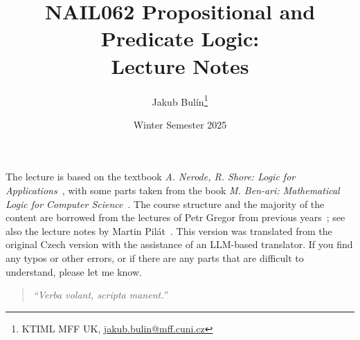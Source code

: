 \title{NAIL062 Propositional and Predicate Logic: \\ Lecture Notes}
\author{Jakub Bulín\footnote{KTIML MFF UK, \href{mailto://jakub.bulin@mff.cuni.cz}{jakub.bulin@mff.cuni.cz}}}
\date{Winter Semester 2025}
\maketitle

The lecture is based on the textbook \emph{A. Nerode, R. Shore: Logic for Applications}~\cite{nerode_logic_2012}, with some parts taken from the book \emph{M. Ben-ari: Mathematical Logic for Computer Science}~\cite{ben-ari_mathematical_2012}. The course structure and the majority of the content are borrowed from the lectures of Petr Gregor from previous years~\cite{gregor_vyrokova_nodate}; see also the lecture notes by Martin Pilát~\cite{pilat_lecture_nodate}. This version was translated from the original Czech version with the assistance of an LLM-based translator. If you find any typos or other errors, or if there are any parts that are difficult to understand, please let me know.

\vfill 

\begin{quote}
    \itshape
    ``Verba volant, scripta manent.''
\end{quote}

\tableofcontents
